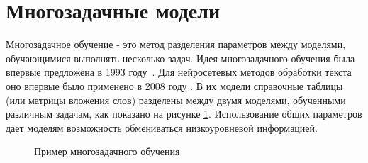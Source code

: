 \section{Многозадачные модели}\label{ch:mtl} 

Многозадачное обучение - это метод разделения параметров между моделями, обучающимися выполнять несколько задач. Идея многозадачного обучения была впервые предложена в 1993 году~\cite{caruana_1997}. Для нейросетевых методов обработки текста оно впервые было применено в 2008 году \cite{collobert_2008}. В их модели справочные таблицы (или матрицы вложения слов) разделены между двумя моделями, обученными различным задачам, как показано на рисунке \ref{fig:MTL1}.
Использование общих параметров дает моделям возможность обмениваться низкоуровневой информацией.


\begin{figure}[ht]
 \caption{Пример многозадачного обучения}\label{fig:MTL1}
\end{figure}

